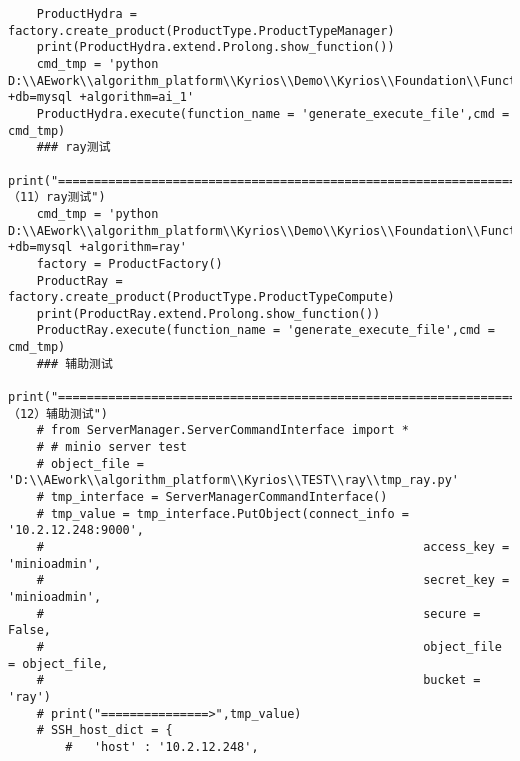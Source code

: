 \documentclass[cn,hazy,blue,14pt,screen]{elegantnote}
\begin{document}
\begin{lstlisting}
	ProductHydra = factory.create_product(ProductType.ProductTypeManager)
	print(ProductHydra.extend.Prolong.show_function())
	cmd_tmp = 'python D:\\AEwork\\algorithm_platform\\Kyrios\\Demo\\Kyrios\\Foundation\\Function\\hydra_main.py +db=mysql +algorithm=ai_1'
	ProductHydra.execute(function_name = 'generate_execute_file',cmd = cmd_tmp)
	### ray测试
	print("======================================================================== （11）ray测试")
	cmd_tmp = 'python D:\\AEwork\\algorithm_platform\\Kyrios\\Demo\\Kyrios\\Foundation\\Function\\ray_main.py +db=mysql +algorithm=ray'
	factory = ProductFactory()
	ProductRay = factory.create_product(ProductType.ProductTypeCompute)
	print(ProductRay.extend.Prolong.show_function())
	ProductRay.execute(function_name = 'generate_execute_file',cmd = cmd_tmp)
	### 辅助测试
	print("======================================================================== （12）辅助测试")
	# from ServerManager.ServerCommandInterface import *
	# # minio server test
	# object_file = 'D:\\AEwork\\algorithm_platform\\Kyrios\\TEST\\ray\\tmp_ray.py'
	# tmp_interface = ServerManagerCommandInterface()
	# tmp_value = tmp_interface.PutObject(connect_info = '10.2.12.248:9000',
	#                                                     access_key = 'minioadmin',
	#                                                     secret_key = 'minioadmin',
	#                                                     secure = False,
	#                                                     object_file = object_file,
	#                                                     bucket = 'ray')                                                    
	# print("===============>",tmp_value)
	# SSH_host_dict = {
		# 	'host' : '10.2.12.248',

\end{lstlisting}
\end{document}
